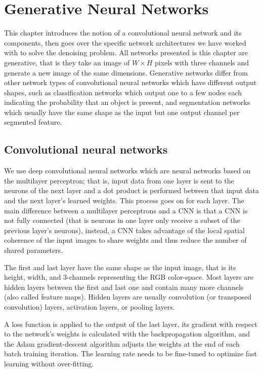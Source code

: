 \chapter{Generative Neural Networks}\label{chap:Arch1}

This chapter introduces the notion of a convolutional neural network and its components, then goes over the specific network architectures we have worked with to solve the denoising problem. All networks presented is this chapter are generative, that is they take an image of $W\times H$ pixels with three channels and generate a new image of the same dimensions. Generative networks differ from other network types of convolutional neural networks which have different output shapes, such as classification networks which output one to a few nodes each indicating the probability that an object is present, and segmentation networks which usually have the same shape as the input but one output channel per segmented feature.

\section{Convolutional neural networks}

We use deep convolutional neural networks which are neural networks based on the multilayer perceptron; that is, input data from one layer is sent to the neurons of the next layer and a dot product is performed between that input data and the next layer's learned weights. This process goes on for each layer. The main difference between a multilayer perceptrons and a \ac{CNN} is that a \ac{CNN} is not fully connected (that is neurons in one layer only receive a subset of the previous layer's neurons), instead, a \ac{CNN} takes advantage of the local spatial coherence of the input images to share weights and thus reduce the number of shared parameters.

The first and last layer have the same shape as the input image, that is its height, width, and 3-channels representing the RGB color-space. Most layers are hidden layers between the first and last one and contain many more channels (also called feature maps). Hidden layers are usually convolution (or transposed convolution) layers, activation layers, or pooling layers.

A loss function is applied to the output of the last layer, its gradient with respect to the network's weights is calculated with the backpropagation algorithm, and the Adam gradient-descent algorithm\cite{adam} adjusts the weights at the end of each batch training iteration. The learning rate needs to be fine-tuned to optimize fast learning without over-fitting.

